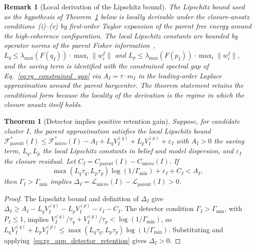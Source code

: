 \documentclass[11pt]{article}
\newtheorem{theorem}{Theorem}
\newtheorem{remark}{Remark}
\begin{document}
\begin{remark}[Local derivation of the Lipschitz bound]
The Lipschitz bound used as the hypothesis of Theorem~\ref{thm:rg_detector_retention} below is locally derivable under the closure-ansatz conditions~(i)--(v) by first-order Taylor expansion of the parent free energy around the high-coherence configuration. The local Lipschitz constants are bounded by operator norms of the parent Fisher information~\cite{Amari2016}, $L_q \le \lambda_{\max}(F(q_I)) \cdot \max_i\|w_i^I\|$ and $L_p \le \lambda_{\max}(F(p_I)) \cdot \max_i\|w_i^I\|$, and the saving term is identified with the constrained spectral gap of Eq.~\eqref{eq:rg_constrained_gap} via $A_I = \tau \cdot m_I$ in the leading-order Laplace approximation around the parent barycenter. The theorem statement retains the conditional form because the locality of the derivation is the regime in which the closure ansatz itself holds.
\end{remark}

\begin{theorem}[Detector implies positive retention gain]
\label{thm:rg_detector_retention}
Suppose, for candidate cluster $I$, the parent approximation satisfies the local Lipschitz bound $\mathcal{F}_{\mathrm{parent}}^*(I) \le \mathcal{F}_{\mathrm{micro}}^*(I) - A_I + L_q V_I^{(q)} + L_p V_I^{(p)} + \varepsilon_I$ with $A_I > 0$ the saving term, $L_q, L_p$ the local Lipschitz constants in belief and model dispersion, and $\varepsilon_I$ the closure residual. Let $C_I = C_{\mathrm{parent}}(I) - C_{\mathrm{micro}}(I)$. If
\begin{equation}
\max(L_q\tau_q, L_p\tau_p)\log(1/\Gamma_{\min}) + \varepsilon_I + C_I < A_I,
\label{eq:rg_app_detector_retention}
\end{equation}
then $\Gamma_I > \Gamma_{\min}$ implies $\Delta_I = \mathcal{L}_{\mathrm{micro}}(I) - \mathcal{L}_{\mathrm{parent}}(I) > 0$.
\end{theorem}

\begin{proof}
The Lipschitz bound and definition of $\Delta_I$ give $\Delta_I \ge A_I - L_q V_I^{(q)} - L_p V_I^{(p)} - \varepsilon_I - C_I$. The detector condition $\Gamma_I > \Gamma_{\min}$, with $P_I \le 1$, implies $V_I^{(q)}/\tau_q + V_I^{(p)}/\tau_p < \log(1/\Gamma_{\min})$, so $L_q V_I^{(q)} + L_p V_I^{(p)} \le \max(L_q\tau_q, L_p\tau_p)\log(1/\Gamma_{\min})$. Substituting and applying~\eqref{eq:rg_app_detector_retention} gives $\Delta_I > 0$.
\end{proof}
\end{document}
